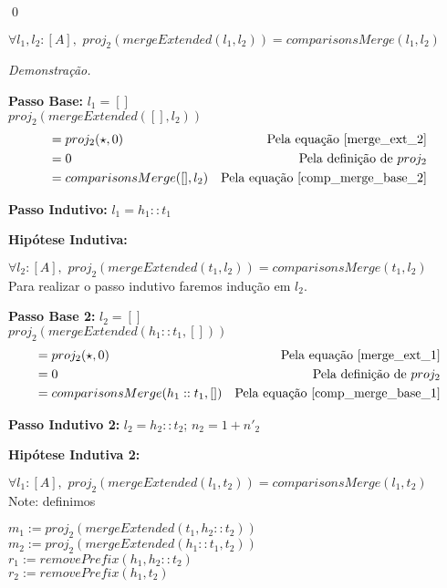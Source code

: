 \documentclass[12pt, oneside, a4paper,english,brazil]{abntex2}
\begin{document}
\qed

\begin{teorema}
  $\forall l_{1}, l_{2} : [A], \,\, proj_{2}(mergeExtended(l_{1}, l_{2})) = comparisonsMerge(l_{1}, l_{2})$
\end{teorema}

\noindent \textit{Demonstra\c{c}\~ao.}

\textbf{Passo Base: } $l_{1} = []$\\

$proj_{2}(mergeExtended([], l_{2}))$
\begin{align*}
  &= proj_{2}(\star, 0) &\text{Pela equa\c{c}\~ao \ref{merge_ext_2}} \\
                                       &= 0 &\text{Pela defini\c{c}\~ao de $proj_{2}$} \\
  &= comparisonsMerge([], l_{2}) &\text{Pela equa\c{c}\~ao \ref{comp_merge_base_2}} \\
\end{align*}

\textbf{Passo Indutivo: } $l_{1} = h_{1} :: t_{1}$

\textbf{Hip\'otese Indutiva: }


\qquad $\forall l_{2} : [A], \,\, proj_{2}(mergeExtended(t_{1}, l_{2})) = comparisonsMerge(t_{1}, l_{2})$ \\

Para realizar o passo indutivo faremos indu\c{c}\~ao em $l_{2}$.

\textbf{Passo Base 2: } $l_{2} = []$\\

$proj_{2}(mergeExtended(h_{1} :: t_{1}, []))$
\begin{align*}
   &= proj_{2}(\star, 0) &\text{Pela equa\c{c}\~ao \ref{merge_ext_1}} \\
                                               &= 0 &\text{Pela defini\c{c}\~ao de $proj_{2}$} \\
  &= comparisonsMerge(h_{1} :: t_{1}, []) &\text{Pela equa\c{c}\~ao \ref{comp_merge_base_1}}
\end{align*}

\textbf{Passo Indutivo 2: } $l_{2} = h_{2} :: t_{2}$; $n_{2} = 1 + n'_{2}$

\textbf{Hip\'otese Indutiva 2: }

\qquad $\forall l_{1} : [A], \,\, proj_{2}(mergeExtended(l_{1}, t_{2})) = comparisonsMerge(l_{1}, t_{2})$ \\

Note: definimos
\begin{center}
$m_{1} := proj_{2}(mergeExtended(t_{1}, h_{2} :: t_{2}))$\\
$m_{2} := proj_{2}(mergeExtended(h_{1} :: t_{1}, t_{2}))$\\
$r_{1} := removePrefix(h_{1}, h_{2} :: t_{2})$\\
$r_{2} := removePrefix(h_{1}, t_{2})$
\end{center}
\end{document}
